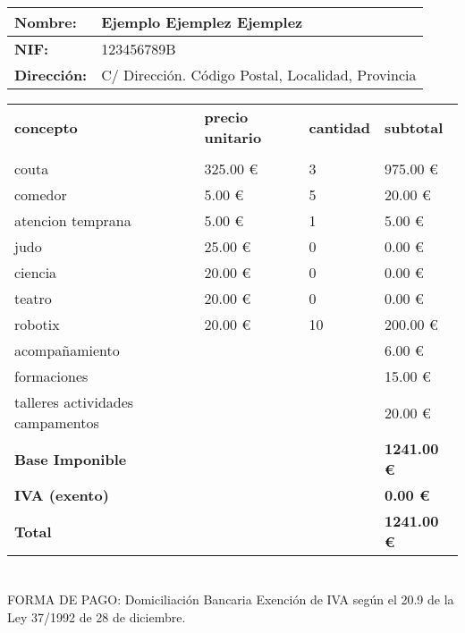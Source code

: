 \documentclass{article}%
\begin{document}
%
\normalsize%
\vspace*{10ex}%
\begin{tabular}{l|l}%
\textbf{Nombre:}&Ejemplo Ejemplez Ejemplez\\%
\hline%
\textbf{NIF:}&123456789B\\%
\hline%
\textbf{Dirección:}&C/ Dirección. Código Postal, Localidad, Provincia\\%
\end{tabular}%
\vspace*{10ex}%
\renewcommand{\arraystretch}{1.5}%
\begin{longtabu}{X[3l] X[c] X[c] X[c]}%
%
\textbf{concepto}&\textbf{precio unitario}&\textbf{cantidad}&\textbf{subtotal}\\%
&&&\\%
\hline%
couta&325.00 €&3&975.00 €\\%
\hline%
comedor&5.00 €&5&20.00 €\\%
\hline%
atencion temprana&5.00 €&1&5.00 €\\%
\hline%
judo&25.00 €&0&0.00 €\\%
\hline%
ciencia&20.00 €&0&0.00 €\\%
\hline%
teatro&20.00 €&0&0.00 €\\%
\hline%
robotix&20.00 €&10&200.00 €\\%
\hline%
acompañamiento&&&6.00 €\\%
\hline%
formaciones&&&15.00 €\\%
\hline%
talleres actividades campamentos&&&20.00 €\\%
\hline%
\textbf{Base Imponible}&&&\textbf{1241.00 €}\\%
\hline%
\textbf{IVA (exento)}&&&\textbf{0.00 €}\\%
\hline%
\textbf{Total}&&&\textbf{1241.00 €}\\%
\end{longtabu}%
\vspace*{10ex}%
\section*{}%
\label{sec:}%
FORMA DE PAGO: Domiciliación Bancaria\newline%
%
Exención de IVA según el 20.9 de la Ley 37/1992 de 28 de diciembre.

%
\pagestyle{firstpage}%
\end{document}
